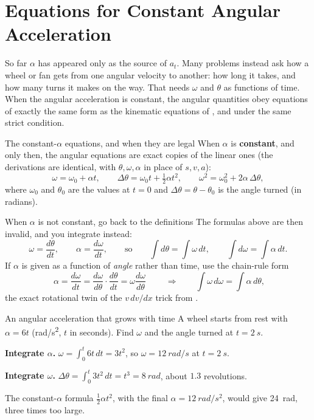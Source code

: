 \section{Equations for Constant Angular Acceleration}\label{sec:constalpha}

So far $\alpha$ has appeared only as the source of $a_t$. Many problems instead ask how a wheel or fan
gets from one angular velocity to another: how long it takes, and how many turns it makes on the way.
That needs $\omega$ and $\theta$ as functions of time. When the angular acceleration is constant, the angular quantities obey equations of exactly the same form as
the kinematic equations of , and under the same strict condition.

\begin{keybox}{The constant-$\alpha$ equations, and when they are legal}
When $\alpha$ is \textbf{constant}, and only then, the angular equations are exact copies of the linear ones
(the derivations are identical, with $\theta,\omega,\alpha$ in place of $s,v,a$):
\[
\omega=\omega_0+\alpha t,\qquad
\Delta\theta=\omega_0t+\tfrac12\alpha t^{2},\qquad
\omega^{2}=\omega_0^{2}+2\alpha\,\Delta\theta,
\]
where $\omega_0$ and $\theta_0$ are the values at $t=0$ and $\Delta\theta=\theta-\theta_0$ is the angle
turned (in radians).
\end{keybox}

\begin{methodbox}{When $\alpha$ is not constant, go back to the definitions}
The formulas above are then invalid, and you integrate instead:
\[
\omega=\frac{d\theta}{dt},\qquad
\alpha=\frac{d\omega}{dt},\qquad
\text{so}\qquad
\int d\theta=\int\omega\,dt,\qquad \int d\omega=\int\alpha\,dt.
\]
If $\alpha$ is given as a function of \emph{angle} rather than time, use the chain-rule form
\[
\boxed{\;\alpha=\frac{d\omega}{dt}=\frac{d\omega}{d\theta}\cdot\frac{d\theta}{dt}=\omega\frac{d\omega}{d\theta}\;}
\qquad\Longrightarrow\qquad
\int\omega\,d\omega=\int\alpha\,d\theta,
\]
the exact rotational twin of the $v\,dv/dx$ trick from .
\end{methodbox}

\begin{exbox}{An angular acceleration that grows with time}
A wheel starts from rest with $\alpha=6t$ (\si{rad/s^2}, $t$ in seconds). Find $\omega$ and the angle
turned at $t=\SI{2}{s}$.

 \textbf{Integrate $\alpha$.} $\omega=\int_0^t 6t\,dt=3t^2$, so $\omega=\SI{12}{rad/s}$ at
$t=\SI{2}{s}$.

 \textbf{Integrate $\omega$.} $\Delta\theta=\int_0^t 3t^2\,dt=t^3=\SI{8}{rad}$, about $1.3$
revolutions.

The constant-$\alpha$ formula $\tfrac12\alpha t^2$, with the final $\alpha=\SI{12}{rad/s^2}$, would give
\SI{24}{rad}, three times too large.
\end{exbox}

